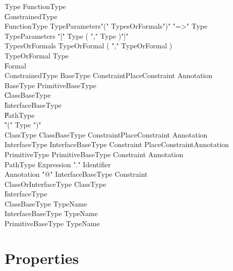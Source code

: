 \begin{grammar}
Type \: FunctionType \\
    \| ConstrainedType  \\

FunctionType \: TypeParameters\opt \xcd"(" TypesOrFormals\opt \xcd")" \xcd"=>" Type  \\
TypeParameters \: \xcd"[" Type ( \xcd"," Type )\star \xcd"]" \\
TypesOrFormals \: TypeOrFormal ( \xcd"," TypeOrFormal )\star \\
TypeOrFormal   \: Type \\
               \| Formal \\

ConstrainedType \: BaseType Constraint\opt PlaceConstraint\opt
Annotation\star \\

BaseType \: PrimitiveBaseType \\
     \| ClassBaseType \\
     \| InterfaceBaseType \\
     \| PathType \\
     \| \xcd"(" Type \xcd")" \\

ClassType \: ClassBaseType Constraint\opt PlaceConstraint\opt
Annotation\star \\
InterfaceType \: InterfaceBaseType Constraint\opt
PlaceConstraint\opt Annotation\star \\
PrimitiveType \: PrimitiveBaseType Constraint\opt
Annotation\star \\

PathType \: Expression \xcd"." Identifier \\

Annotation \: \xcd"@" InterfaceBaseType Constraint\opt \\

ClassOrInterfaceType \: ClassType \\ \| InterfaceType \\
ClassBaseType \: TypeName \\
InterfaceBaseType \: TypeName \\
PrimitiveBaseType \: TypeName \\
\end{grammar}

\section{Properties}\label{DepType:Properties}

